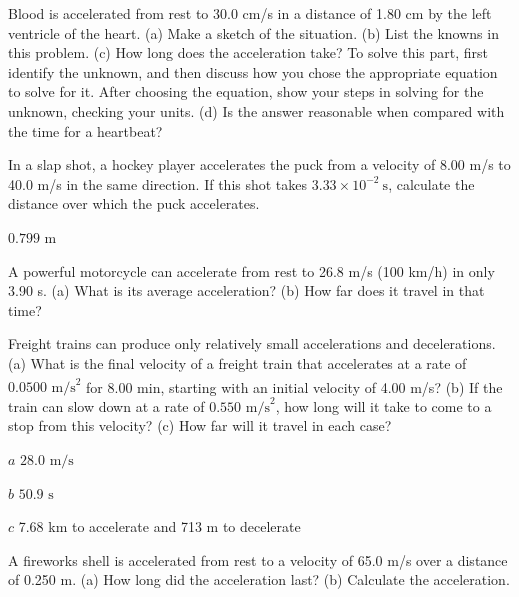 \documentclass[
]{book}
\begin{document}
Blood is accelerated from rest to 30.0 cm/s in a distance of 1.80 cm by
the left ventricle of the heart. (a) Make a sketch of the situation. (b)
List the knowns in this problem. (c) How long does the acceleration
take? To solve this part, first identify the unknown, and then discuss
how you chose the appropriate equation to solve for it. After choosing
the equation, show your steps in solving for the unknown, checking your
units. (d) Is the answer reasonable when compared with the time for a
heartbeat?

\hypertarget{fs-id1164906467421}{}
\leavevmode{}%
In a slap shot, a hockey player accelerates the puck from a velocity of
8.00 m/s to 40.0 m/s in the same direction. If this shot takes
\({3\text{.}\text{33} \times \text{10}^{- 2}\ \text{s}}{}\), calculate the
distance over which the puck accelerates.

\leavevmode{}%
\({0\text{.}\text{799\ m}}{}\)

\hypertarget{fs-id1164906508513}{}
\leavevmode{}%
A powerful motorcycle can accelerate from rest to 26.8 m/s (100 km/h) in
only 3.90 s. (a) What is its average acceleration? (b) How far does it
travel in that time?

\hypertarget{fs-id1164906451358}{}
\leavevmode{}%
Freight trains can produce only relatively small accelerations and
decelerations. (a) What is the final velocity of a freight train that
accelerates at a rate of
\({0\text{.}\text{0500\ m/s}^{2}}{}\)\textsuperscript{} for
8.00 min, starting with an initial velocity of 4.00 m/s? (b) If the
train can slow down at a rate of \({0\text{.}\text{550\ m/s}^{2}}{}\), how
long will it take to come to a stop from this velocity? (c) How far will
it travel in each case?

\leavevmode{}%
\(a\) \({\text{28}\text{.}\text{0\ m/s}}{}\)

\(b\) \({\text{50}\text{.}\text{9\ s}}{}\)

\(c\) 7.68 km to accelerate and 713 m to decelerate

\hypertarget{fs-id1164906430928}{}
\leavevmode{}%
A fireworks shell is accelerated from rest to a velocity of 65.0 m/s
over a distance of 0.250 m. (a) How long did the acceleration last? (b)
Calculate the acceleration.
\end{document}
